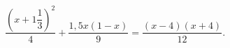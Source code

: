 \begin{ex}[type=equation]
	\begin{condition}
		$\dfrac{\left(x + 1\dfrac{1}{3}\right)^2}{4}+ \dfrac{1,5x(1 - x)}{9} = \dfrac{(x - 4)(x + 4)}{12}.$
	\end{condition}
\end{ex}